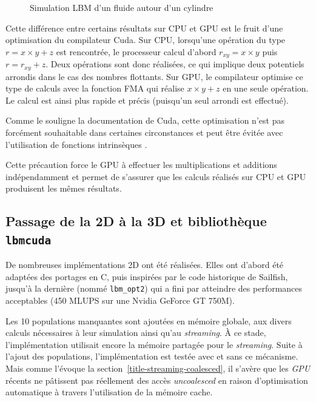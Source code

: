 \begin{figure}[h]
{		\label{fig:lbm_42000}
	}
	\caption{Simulation \ac{LBM} d'un fluide autour d'un cylindre}
	\label{fig:lbm_5000_to_43000}
\end{figure}

Cette différence entre certains résultats sur \ac{CPU} et \ac{GPU} est le fruit d'une optimisation du compilateur Cuda. Sur \ac{CPU}, lorsqu'une opération du type $r = x \times y+z$ est rencontrée, le processeur calcul d'abord $r_{xy} = x \times y$ puis $r = r_{xy} + z$. Deux opérations sont donc réalisées, ce qui implique deux potentiels arrondis dans le cas des nombres flottants. Sur \ac{GPU}, le compilateur optimise ce type de calculs \cite{ZZZweb_cuda_2017-1} avec la fonction \ac{FMA} qui réalise $x \times y+z$ en une seule opération. Le calcul est ainsi plus rapide et précis (puisqu'un seul arrondi est effectué).

Comme le souligne la documentation de Cuda, cette optimisation n'est pas forcément souhaitable dans certaines circonstances et peut être évitée avec l'utilisation de fonctions intrinsèques \cite{ZZZweb_cuda_2017-1, ZZZweb_cuda_2017-2}.

Cette précaution force le \ac{GPU} à effectuer les multiplications et additions indépendamment et permet de s’assurer que les calculs réalisés sur \ac{CPU} et \ac{GPU} produisent les mêmes résultats.

\subsection{Passage de la 2D à la 3D et bibliothèque \texttt{lbmcuda}}
De nombreuses implémentations 2D ont été réalisées. Elles ont d’abord été adaptées des portages en C, puis inspirées par le code historique de Sailfish, jusqu’à la dernière (nommé \texttt{lbm\_opt2}) qui a fini par atteindre des performances acceptables (450 MLUPS sur une Nvidia GeForce GT 750M). 

Les 10 populations manquantes sont ajoutées en mémoire globale, aux divers calculs nécessaires à leur simulation ainsi qu'au \textit{streaming}. À ce stade, l'implémentation utilisait encore la mémoire partagée pour le \textit{streaming}. Suite à l'ajout des populations, l'implémentation est testée avec et sans ce mécanisme. Mais comme l'évoque la section~\ref{title-streaming-coalesced}, il s'avère que les \textit{GPU} récents ne pâtissent pas réellement des accès \textit{uncoalesced} en raison d'optimisation automatique à travers l'utilisation de la mémoire cache.

